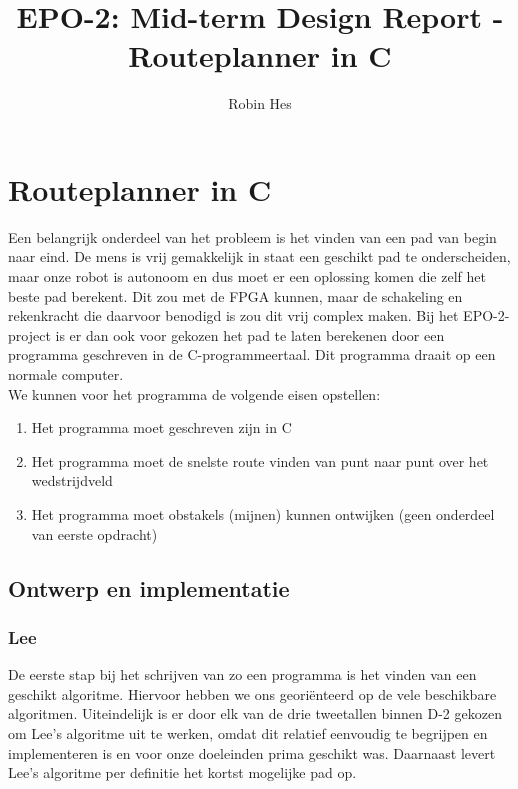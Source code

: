 \documentclass{report}
\title{EPO-2: Mid-term Design Report - Routeplanner in C}
\author{Robin Hes}
\begin{document}
\chapter{Routeplanner in C}
\label{ch:route}

Een belangrijk onderdeel van het probleem is het vinden van een pad van begin naar eind. De mens is vrij gemakkelijk in staat een geschikt pad te onderscheiden, maar onze robot is autonoom en dus moet er een oplossing komen die zelf het beste pad berekent. Dit zou met de FPGA kunnen, maar de schakeling en rekenkracht die daarvoor benodigd is zou dit vrij complex maken. Bij het EPO-2-project is er dan ook voor gekozen het pad te laten berekenen door een programma geschreven in de C-programmeertaal. Dit programma draait op een normale computer.
\\

\noindent
We kunnen voor het programma de volgende eisen opstellen:

\begin{enumerate}
	\item Het programma moet geschreven zijn in C
	\item Het programma moet de snelste route vinden van punt naar punt over het wedstrijdveld
	\item Het programma moet obstakels (mijnen) kunnen ontwijken (geen onderdeel van eerste opdracht)
\end{enumerate}

\section{Ontwerp en implementatie}
\label{sec:ontwerp-impl}

\subsection{Lee}
\label{ssec:lee}

De eerste stap bij het schrijven van zo een programma is het vinden van een geschikt algoritme. Hiervoor hebben we ons georiënteerd op de vele beschikbare algoritmen. Uiteindelijk is er door elk van de drie tweetallen binnen D-2 gekozen om Lee's algoritme uit te werken, omdat dit relatief eenvoudig te begrijpen en implementeren is en voor onze doeleinden prima geschikt was. Daarnaast levert Lee's algoritme per definitie het kortst mogelijke pad op. 
\end{document}
